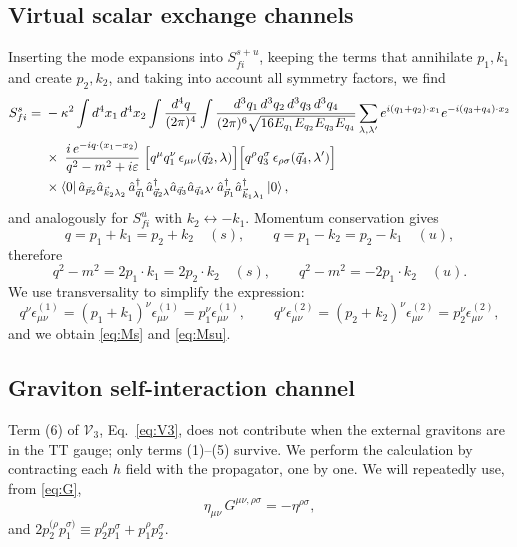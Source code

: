 \documentclass[12pt,a4paper,oneside]{article}
\numberwithin{equation}{section}   %
\begin{document}
\subsection{Virtual scalar exchange channels}
Inserting the mode expansions into $S^{s+u}_{fi}$, keeping the terms that annihilate $p_1,k_1$ and create
$p_2,k_2$, and taking into account all symmetry factors, we find
\begin{align}
S^{s}_{fi}=\;&-\kappa^{2}
\int d^{4}x_1\,d^{4}x_2
\int\frac{d^{4}q}{(2\pi)^{4}}
\int\frac{d^{3}q_1\,d^{3}q_2\,d^{3}q_3\,d^{3}q_4}
{(2\pi)^{6}\sqrt{16E_{q_1}E_{q_2}E_{q_3}E_{q_4}}}
\sum_{\lambda,\lambda'}
e^{i(q_1+q_2)\cdot x_1}e^{-i(q_3+q_4)\cdot x_2}\notag\\
&\times\;
\frac{i\,e^{-iq\cdot(x_1-x_2)}}{q^{2}-m^{2}+i\varepsilon}\;
\Bigl[q^{\mu}q_{1}^{\nu}\,\epsilon_{\mu\nu}(\vec q_2,\lambda)\Bigr]
\Bigl[q^{\rho}q_{3}^{\sigma}\,\epsilon_{\rho\sigma}(\vec q_4,\lambda')\Bigr]\notag\\
&\times
\bra{0}\hat a_{\vec p_2}\hat a_{\vec k_2\lambda_2}\,
\hat a^{\dagger}_{\vec q_1}\hat a^{\dagger}_{\vec q_2\lambda}\hat a_{\vec q_3}\hat a_{\vec q_4\lambda'}\,
\hat a^{\dagger}_{\vec p_1}\hat a^{\dagger}_{\vec k_1\lambda_1}\ket{0},
\label{eq:sfull}
\end{align}
and analogously for $S^u_{fi}$ with $k_2\leftrightarrow -k_1$.
Momentum conservation gives
\begin{equation}
q=p_1+k_1=p_2+k_2\quad(s),
\qquad
q=p_1-k_2=p_2-k_1\quad(u),
\end{equation}
therefore
\begin{equation}
q^{2}-m^{2}=2p_1\!\cdot\!k_1=2p_2\!\cdot\!k_2 \quad(s),
\qquad
q^{2}-m^{2}=-2p_1\!\cdot\!k_2\quad(u).
\end{equation}
We use transversality to simplify the expression:
\begin{equation}
q^{\nu}\epsilon^{(1)}_{\mu\nu}=(p_1+k_1)^{\nu}\epsilon^{(1)}_{\mu\nu}
=p_1^{\nu}\epsilon^{(1)}_{\mu\nu},
\qquad
q^{\nu}\epsilon^{(2)}_{\mu\nu}=(p_2+k_2)^{\nu}\epsilon^{(2)}_{\mu\nu}
=p_2^{\nu}\epsilon^{(2)}_{\mu\nu},
\end{equation}
and we obtain \eqref{eq:Ms} and \eqref{eq:Msu}.

\subsection{Graviton self-interaction channel}
Term (6) of $\mathcal V_3$, Eq.~\eqref{eq:V3}, does not contribute when the
external gravitons are in the TT gauge; only terms (1)--(5) survive.
We perform the calculation by contracting each $h$ field with the propagator, one by one. We will
repeatedly use, from \eqref{eq:G},
\begin{equation}
\eta_{\mu\nu}\,G^{\mu\nu,\rho\sigma}=-\eta^{\rho\sigma},
\end{equation}
and
$2p_2^{(\rho}p_1^{\sigma)}\equiv p_2^\rho p_1^\sigma+p_1^\rho p_2^\sigma$.
\end{document}
